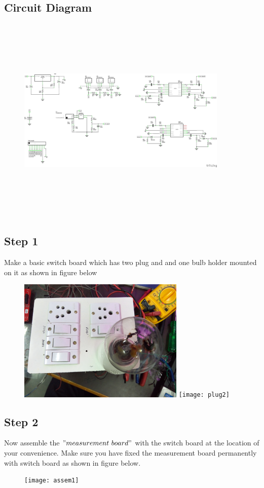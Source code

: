 \documentclass[a4paper,12pt,oneside]{book}
\begin{document}
\subsection*{Circuit Diagram}
\begin{figure}[h]
	\includegraphics[width=380px,height=380px]{schematic}
\end{figure}
\newpage
\subsection*{Step 1}
Make a basic switch board which has two plug and and one bulb holder mounted on it as 
shown in figure below
\begin{figure}[h]
	\includegraphics[width=300px]{plug1}
	\texttt{[image: plug2]}
\end{figure}
\newpage
\subsection*{Step 2}
Now assemble the $"measurement\ board"$ with the switch board at the location of your convenience. Make sure you have fixed the measurement board permanently with switch board as shown in figure below. 
\begin{figure}[h]
	\texttt{[image: assem1]}
\end{figure}
\end{document}
